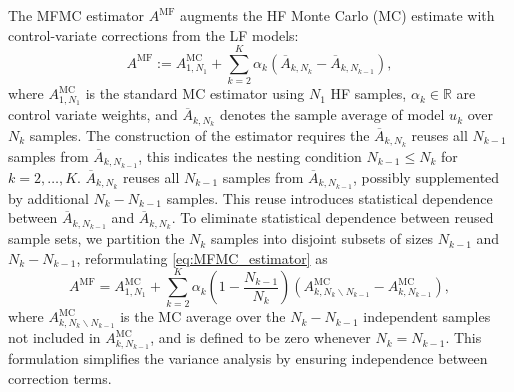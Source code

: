 The MFMC estimator $A^{\text{MF}}$ augments the HF Monte Carlo (MC) estimate with control-variate corrections from the LF models:
%
\begin{equation}\label{eq:MFMC_estimator}
    A^{\text{MF}} := A^{\text{MC}}_{1,N_1} + \sum_{k=2}^K \alpha_k\left(\overline{A}_{k,N_k} - \overline{A}_{k,N_{k-1}}\right),
\end{equation}
%
where $A^{\text{MC}}_{1,N_1}$ is the standard MC estimator using $N_1$ HF samples, $\alpha_k \in \mathbb{R}$ are control variate weights, and $\overline{A}_{k,N_k}$ denotes the sample average of model $u_{k}$ over $N_k$ samples. The construction of the estimator requires the $\overline{A}_{k,N_{k}}$ reuses all $N_{k-1}$ samples from $\overline{A}_{k,N_{k-1}}$, this indicates the nesting condition $N_{k-1}\le N_k$ for $k=2,\ldots, K$. $\overline{A}_{k,N_{k}}$ reuses all $N_{k-1}$ samples from $\overline{A}_{k,N_{k-1}}$, possibly supplemented by additional $N_{k} - N_{k-1}$ samples. This reuse introduces statistical dependence between $\overline{A}_{k,N_{k-1}}$ and $\overline{A}_{k,N_{k}}$. To eliminate statistical dependence between reused sample sets, we partition the $N_k$ samples into disjoint subsets of sizes $N_{k-1}$ and $N_k-N_{k-1}$, reformulating \eqref{eq:MFMC_estimator} as
%
\begin{equation}\label{eq:MFMC_estimator_independent}
    A^{\text{MF}} = A^{\text{MC}}_{1,N_1} +  \sum_{k=2}^K \alpha_k\!\left(1-\frac{N_{k-1}}{N_k}\right)\left(A^{\text{MC}}_{k,N_k\backslash N_{k-1}}-A^{\text{MC}}_{k,N_{k-1}}\right),
\end{equation}
%
where $A^{\text{MC}}_{k,N_k\backslash N_{k-1}}$ is the MC average over the $N_k-N_{k-1}$ independent samples not included in $A^{\text{MC}}_{k,N_{k-1}}$, and is defined to be zero whenever $N_k=N_{k-1}$. This formulation simplifies the variance analysis by ensuring independence between correction terms.

